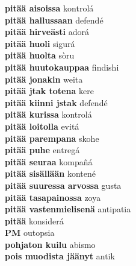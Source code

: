 \textbf{ pitää aisoissa  } kontrolá \\
\textbf{ pitää hallussaan  } defendé \\
\textbf{ pitää hirveästi  } adorá \\
\textbf{ pitää huoli  } sigurá \\
\textbf{ pitää huolta  } sòru \\
\textbf{ pitää huutokauppaa  } findishi \\
\textbf{ pitää jonakin  } weita \\
\textbf{ pitää jtak totena  } kere \\
\textbf{ pitää kiinni jstak  } defendé \\
\textbf{ pitää kurissa  } kontrolá \\
\textbf{ pitää loitolla  } evitá \\
\textbf{ pitää parempana  } skohe \\
\textbf{ pitää puhe  } entregá \\
\textbf{ pitää seuraa  } kompañá \\
\textbf{ pitää sisällään  } kontené \\
\textbf{ pitää suuressa arvossa  } gusta \\
\textbf{ pitää tasapainossa  } zoya \\
\textbf{ pitää vastenmielisenä  } antipatia \\
\textbf{ pitää  } konsiderá \\
\textbf{ PM  } outopsia \\
\textbf{ pohjaton kuilu  } abismo \\
\textbf{ pois muodista jäänyt  } antik \\
